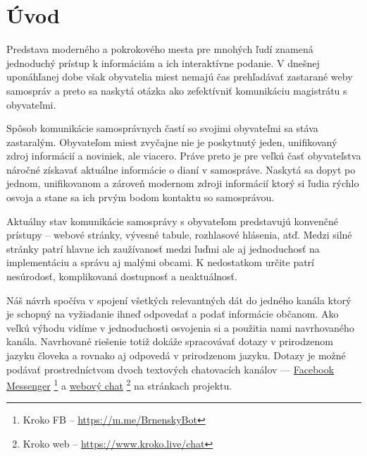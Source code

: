 \documentclass{ExcelAtFIT}
\affiliation{*%
  \href{mailto:xjusko00@stud.fit.vutbr.cz}{xjusko00@stud.fit.vutbr.cz},
  \textit{Faculty of Information Technology, Brno University of Technology}}
\begin{document}
\startdocument



\section{Úvod}

Predstava moderného a pokrokového mesta pre mnohých ľudí znamená jednoduchý prístup k informáciám a ich interaktívne podanie. V dnešnej uponáhľanej dobe však obyvatelia miest nemajú čas prehľadávať zastarané weby samospráv a preto sa naskytá otázka ako zefektívniť komunikáciu magistrátu s obyvateľmi. 


Spôsob komunikácie samosprávnych častí so svojimi obyvateľmi sa stáva zastaralým. Obyvateľom miest zvyčajne nie je poskytnutý jeden, unifikovaný zdroj informácií a noviniek, ale viacero. Práve preto je pre veľkú časť obyvateľstva náročné získavať aktuálne informácie o dianí v samospráve. Naskytá sa dopyt po jednom, unifikovanom a zároveň modernom zdroji informácií ktorý si ľudia rýchlo osvoja a stane sa ich prvým bodom kontaktu so samosprávou. 

Aktuálny stav komunikácie samosprávy s obyvateľom predstavujú konvenčné prístupy -- webové stránky, vývesné tabule, rozhlasové hlásenia, atď. Medzi silné stránky patrí hlavne ich zaužívanosť medzi ľuďmi ale aj jednoduchosť na implementáciu a správu aj malými obcami. K nedostatkom určite patrí nesúrodosť, komplikovaná dostupnosť a neaktuálnosť.

Náš návrh spočíva v spojení všetkých relevantných dát do jedného kanála ktorý je schopný na vyžiadanie ihneď odpovedať a podať informácie občanom. Ako veľkú výhodu vidíme v jednoduchosti osvojenia si a použitia nami navrhovaného kanála. Navrhované riešenie totiž dokáže spracovávať dotazy v prirodzenom jazyku človeka a rovnako aj odpovedá v prirodzenom jazyku. Dotazy je možné podávať prostredníctvom dvoch textových chatovacích kanálov --- \href{https://m.me/BrnenskyBot}{Facebook Messenger} \footnote{Kroko FB -- \url{https://m.me/BrnenskyBot}} a \href{https://www.kroko.live/chat}{webový chat} \footnote{Kroko web -- \url{https://www.kroko.live/chat}} na stránkach projektu.
\end{document}
